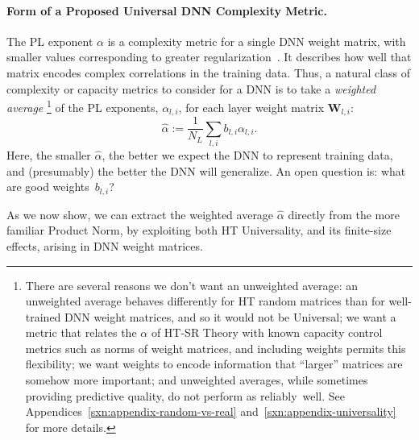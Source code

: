 \paragraph{Form of a Proposed Universal DNN Complexity Metric.} 

The PL exponent $\alpha$ is a complexity metric for a single DNN weight matrix, with smaller values corresponding to greater regularization~\cite{MM18_TR}.
It describes how well that matrix encodes complex correlations in the training data.
Thus, a natural class of complexity or capacity metrics to consider for a DNN is to take a \emph{weighted average}%
\footnote{There are several reasons we don't want an unweighted average: 
an unweighted average behaves differently for HT random matrices than for well-trained DNN weight matrices, and so it would not be Universal; 
we want a metric that relates the $\alpha$ of HT-SR Theory with known capacity control metrics such as norms of weight matrices, and including weights permits this flexibility; 
we want weights to encode information that ``larger'' matrices are somehow more important;
and unweighted averages, while sometimes providing predictive quality, do not perform as reliably~well. 
See Appendices~\ref{sxn:appendix-random-vs-real} and~\ref{sxn:appendix-universality} for more details.
}
of the PL exponents, $\alpha_{l,i}$, for each layer weight matrix $\mathbf{W}_{l,i}$:
\begin{equation}
\hat{\alpha}:=\dfrac{1}{N_L}\sum_{l,i}b_{l,i}\alpha_{l,i}  .
\label{eqn:alpha_hat_generic}
\end{equation}
Here, the smaller $\hat{\alpha}$, the better we expect the DNN to represent training data, and (presumably) the better the DNN will generalize.  %
An open question is: what are good weights~$b_{l,i}$?

As we now show, we can extract the weighted average $\hat{\alpha}$ directly from the more familiar Product Norm, by exploiting both HT Universality, and its finite-size effects, arising
in DNN weight matrices.




